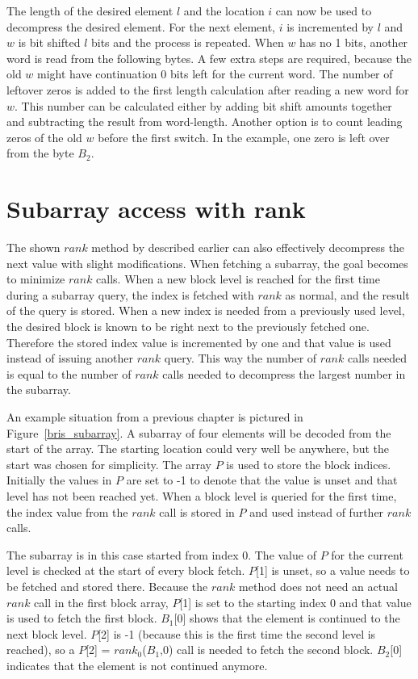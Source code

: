 The length of the desired element $l$ and the location $i$ can now be used to decompress the desired element. For the next element, $i$ is incremented by $l$ and $w$ is bit shifted $l$ bits and the process is 
repeated. When $w$ has no 1 bits, another word is read from the following bytes. A few extra steps are required, because the old $w$ might have continuation 0 bits left for the current word. The number of leftover 
zeros is added to the first length calculation after reading a new word for $w$. This number can be calculated either by adding bit shift amounts together and subtracting the result from word-length. Another option is to count 
leading zeros of the old $w$ before the first switch. In the example, one zero is left over from the byte $B_2$.

\section{Subarray access with rank}
The shown $rank$ method by \citeauthor{Bri09} described earlier can also effectively decompress the next value with slight modifications. When fetching a subarray, the goal becomes to minimize $rank$ calls. 
When a new block level is reached for the first time during a subarray query, the index is fetched with $rank$ as normal, and the result of the query is stored. When a new index is needed from a previously 
used level, the desired block is known to be right next to the previously fetched one. Therefore the stored index value is incremented by one and that value is used instead of issuing another $rank$ query. 
This way the number of $rank$ calls needed is equal to the number of $rank$ calls needed to decompress the largest number in the subarray.


An example situation from a previous chapter is pictured in Figure~\ref{bris_subarray}. A subarray of four elements will be decoded from the start of the array. The starting location could very well be 
anywhere, but the start was chosen for simplicity. The array $P$ is used to store the block indices. Initially the values in $P$ are set to -1 to denote that the value is unset and that level has not been 
reached yet. When a block level is queried for the first time, the index value from the $rank$ call is stored in $P$ and used instead of further $rank$ calls. 

The subarray is in this case started from index 0. The value of $P$ for the current level is checked at the start of every block fetch. $P$[1] is unset, so a value needs to be fetched and stored there. Because 
the $rank$ method does not need an actual $rank$ call in the first block array, $P$[1] is set to the starting index 0 and that value is used to fetch the first block. $B_1$[0] shows that the element is 
continued to the next block level. $P$[2] is -1 (because this is the first time the second level is reached), so a $P$[2] = $rank_0$($B_1$,0) call is needed to fetch the second block. $B_2$[0] indicates 
that the element is not continued anymore.

